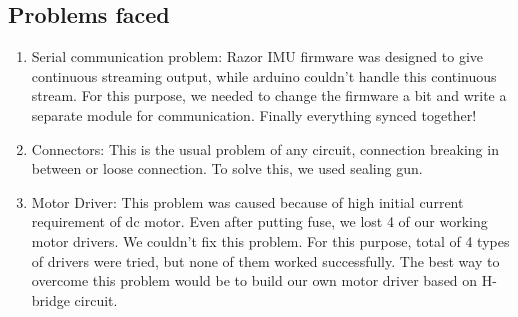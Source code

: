 \documentclass[a4paper , 12pt]{article}
\begin{document}
\subsection{Problems faced}
\begin{enumerate}
\item	Serial communication problem: 
Razor IMU firmware was designed to give continuous streaming output, while arduino couldn’t handle this continuous stream. For this purpose, we needed to change the firmware a bit and write a separate module for communication. Finally everything synced together!
\item	Connectors:
This is the usual problem of any circuit, connection breaking in between or loose connection. To solve this, we used sealing gun.
\item	Motor Driver:
This problem was caused because of high initial current requirement of dc motor. Even after putting fuse, we lost 4 of our working motor drivers. We couldn’t fix this problem. For this purpose, total of 4 types of drivers were tried, but none of them worked successfully. The best way to overcome this problem would be to build our own motor driver based on H-bridge circuit.

\end{enumerate}

\newpage
\end{document}
